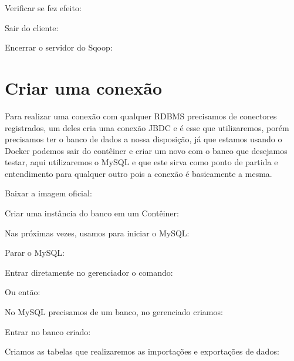 \documentclass[a4paper,11pt]{article}
\begin{document}
Verificar se fez efeito: \\

Sair do cliente: \\

Encerrar o servidor do Sqoop: \\

\section{Criar uma conexão}
Para realizar uma conexão com qualquer RDBMS precisamos de conectores registrados, um deles cria uma conexão JBDC e é esse que utilizaremos, porém precisamos ter o banco de dados a nossa disposição, já que estamos usando o Docker podemos sair do contêiner e criar um novo com o banco que desejamos testar, aqui utilizaremos o MySQL e que este sirva como ponto de partida e entendimento para qualquer outro pois a conexão é basicamente a mesma.

Baixar a imagem oficial: \\

Criar uma instância do banco em um Contêiner: \\

Nas próximas vezes, usamos para iniciar o MySQL: \\

Parar o MySQL: \\

Entrar diretamente no gerenciador o comando: \\

Ou então: \\

No MySQL precisamos de um banco, no gerenciado criamos: \\

Entrar no banco criado:

Criamos as tabelas que realizaremos as importações e exportações de dados: \\
\end{document}
